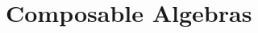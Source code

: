 \makeatother
\EndFmtInput
%

%
\makeatletter

\let\Varid\mathsf
\let\Conid\mathsf






\newcommand{\ty}[1]{\Conid{#1}}
\newcommand{\con}[1]{\Conid{#1}}
\newcommand{\id}[1]{\Varid{#1}}
\newcommand{\cl}[1]{\Varid{#1}}
\newcommand{\opsym}[1]{\mathrel{#1}}

\newcommand\Keyword[1]{\textbf{\textsf{#1}}}
\newcommand\Hide{\mathbin{\downarrow}}
\newcommand\Reveal{\mathbin{\uparrow}}


\makeatother
\EndFmtInput






\section{Composable Algebras}
\label{sec:composable}


